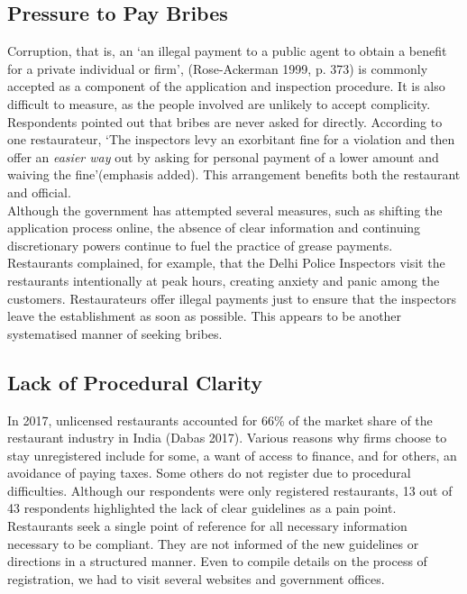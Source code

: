 \documentclass[a4paper, 12pt]{article}
\begin{document}
		\subsection{Pressure to Pay Bribes}
		Corruption, that is, an ‘an illegal payment to a public agent to obtain a benefit for a private individual or firm’, (Rose-Ackerman 1999, p. 373) is commonly accepted as a component of the application and inspection procedure. It is also difficult to measure, as the people involved are unlikely to accept complicity. Respondents pointed out that bribes are never asked for directly. According to one restaurateur, ‘The inspectors levy an exorbitant fine for a violation and then offer an \textit{easier way} out by asking for personal payment of a lower amount and waiving the fine’(emphasis added). This arrangement benefits both the restaurant and official.\\
		Although the government has attempted several measures, such as shifting the application process online, the absence of clear information and continuing discretionary powers continue to fuel the practice of grease payments. Restaurants complained, for example, that the Delhi Police Inspectors visit the restaurants intentionally at peak hours, creating anxiety and panic among the customers. Restaurateurs offer illegal payments just to ensure that the inspectors leave the establishment as soon as possible. This appears to be another systematised manner of seeking bribes.
				
		\subsection {Lack of Procedural Clarity}
		In 2017, unlicensed restaurants accounted for 66\% of the market share of the restaurant industry in India (Dabas 2017). Various reasons why firms choose to stay unregistered include for some, a want of access to finance, and for others, an avoidance of paying taxes. Some others do not register due to procedural difficulties. Although our respondents were only registered restaurants, 13 out of 43 respondents highlighted the lack of clear guidelines as a pain point. Restaurants seek a single point of reference for all necessary information necessary to be compliant. They are not informed of the new guidelines or directions in a structured manner. Even to compile details on the process of registration, we had to visit several websites and government offices.
		
\end{document}
